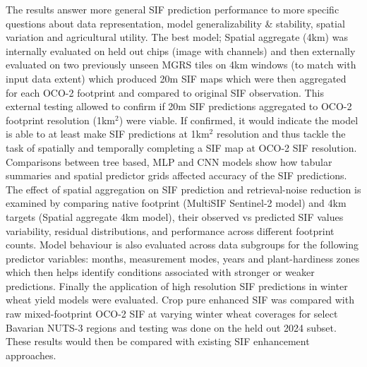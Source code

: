 The results answer more general SIF prediction performance to more specific questions about data representation, model generalizability \& stability,  spatial variation and agricultural utility. The best model; Spatial aggregate (4km) was internally evaluated on held out chips (image with channels) and then externally evaluated on two previously unseen MGRS tiles on 4km windows (to match with input data extent) which produced 20m SIF maps which were then aggregated for each OCO-2 footprint and compared to original SIF observation. This external testing allowed to confirm if 20m SIF predictions aggregated to OCO-2 footprint resolution (1km$^2$) were viable. If confirmed, it would indicate the model is able to at least make SIF predictions at 1km$^2$ resolution and thus tackle the task of spatially and temporally completing a SIF map at OCO-2 SIF resolution. Comparisons between tree based, MLP and CNN models show how tabular summaries and spatial predictor grids affected accuracy of the SIF predictions. The effect of spatial aggregation on SIF prediction and retrieval-noise reduction is examined by comparing native footprint (MultiSIF Sentinel-2 model) and 4km targets (Spatial aggregate 4km model), their observed vs predicted SIF values variability, residual distributions, and performance across different footprint counts. Model behaviour is also evaluated across data subgroups for the following predictor variables: months, measurement modes, years and plant-hardiness zones which then helps identify conditions associated with stronger or weaker predictions. Finally the application of high resolution SIF predictions in winter wheat yield models were evaluated. Crop pure enhanced SIF was compared with raw mixed-footprint OCO-2 SIF at varying winter wheat coverages for select Bavarian NUTS-3 regions and testing was done on the held out 2024 subset. These results would then be compared with existing SIF enhancement approaches. 

